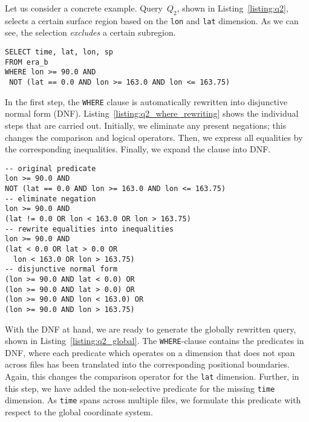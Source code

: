 \documentclass[conference]{IEEEtran}
\newcommand{\smalltt}[1]{{\texttt{\small #1}}}
\begin{document}
Let us consider a concrete example. Query~$Q_2$, shown in Listing~\ref{listing:q2}, selects a certain surface region based on the \smalltt{lon} and \smalltt{lat} dimension. As we can see, the selection \textit{excludes} a certain subregion.
\begin{minipage}{\linewidth}
\begin{lstlisting}[style=sql, caption={Example query~$Q_2$ (non-convex predicates).}, label={listing:q2}]
SELECT time, lat, lon, sp
FROM era_b
WHERE lon >= 90.0 AND
 NOT (lat == 0.0 AND lon >= 163.0 AND lon <= 163.75)
\end{lstlisting}
\end{minipage}

\noindent In the first step, the \smalltt{WHERE} clause is automatically rewritten into disjunctive normal form (DNF). Listing~\ref{listing:q2_where_rewriting} shows the individual steps that are carried out. Initially, we eliminate any present negations; this changes the comparison and logical operators. Then, we express all equalities by the corresponding inequalities. Finally, we expand the clause into DNF. 

\begin{lstlisting}[style=sql, caption={Individual rewriting-steps of query~$Q_2$ into DNF.}, label={listing:q2_where_rewriting}]
-- original predicate
lon >= 90.0 AND 
NOT (lat == 0.0 AND lon >= 163.0 AND lon <= 163.75)
-- eliminate negation
lon >= 90.0 AND 
(lat != 0.0 OR lon < 163.0 OR lon > 163.75)
-- rewrite equalities into inequalities
lon >= 90.0 AND 
(lat < 0.0 OR lat > 0.0 OR 
  lon < 163.0 OR lon > 163.75)
-- disjunctive normal form
(lon >= 90.0 AND lat < 0.0) OR 
(lon >= 90.0 AND lat > 0.0) OR
(lon >= 90.0 AND lon < 163.0) OR 
(lon >= 90.0 AND lon > 163.75)
\end{lstlisting}

With the DNF at hand, we are ready to generate the globally rewritten query, shown in Listing~\ref{listing:q2_global}. The \smalltt{WHERE}-clause contains the predicates in DNF, where each predicate which operates on a dimension that does not span across files has been translated into the corresponding positional boundaries. Again, this changes the comparison operator for the \smalltt{lat} dimension. Further, in this step, we have added the non-selective predicate for the missing \smalltt{time} dimension. As \smalltt{time} spans across multiple files, we formulate this predicate with respect to the global coordinate system.
\end{document}
